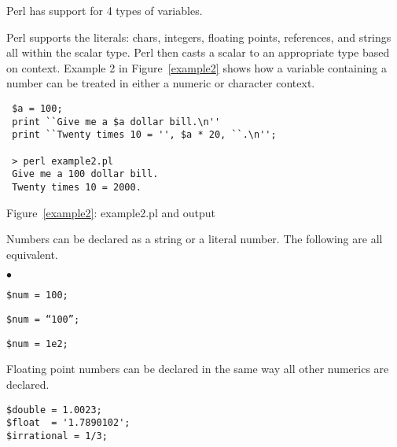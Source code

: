 \documentclass{article}
\begin{document}
Perl has support for 4 types of variables.

Perl supports the literals: chars, integers, floating points,
references, and strings all within the scalar type.  Perl then casts a
scalar to an appropriate type based on context.  Example 2 in Figure~\ref{example2} shows how a variable containing a number can be treated
in either a numeric or character context.
  
\begin{verbatim}
 $a = 100;
 print ``Give me a $a dollar bill.\n''
 print ``Twenty times 10 = '', $a * 20, ``.\n'';  

 > perl example2.pl
 Give me a 100 dollar bill.
 Twenty times 10 = 2000.
\end{verbatim}
\label{example2}
\begin{center}{Figure~\ref{example2}: example2.pl and output}\end{center}


Numbers can be declared as a string or a literal number.  The
following are all equivalent.
\begin{list}{$ \bullet $}{}
\item {\tt \$num = 100;}
\item {\tt \$num = ``100'';}
\item {\tt \$num = 1e2;}
\end{list}

Floating point numbers can be declared in the same way all other
numerics are declared.

\begin{verbatim}
$double = 1.0023;
$float  = '1.7890102';
$irrational = 1/3;
\end{verbatim}
\end{document}
